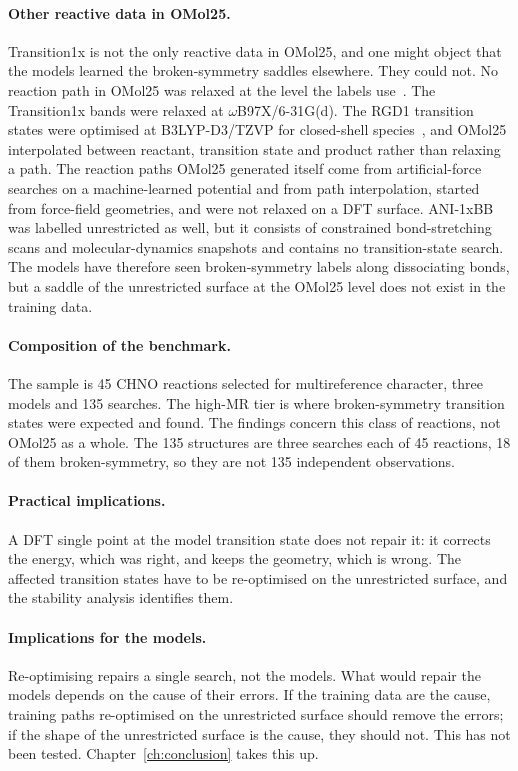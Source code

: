 \paragraph{Other reactive data in OMol25.} Transition1x is not the only
reactive data in OMol25, and one might object that the models learned
the broken-symmetry saddles elsewhere. They could not. No reaction
path in OMol25 was relaxed at the level the labels use~\cite{omol25}.
The Transition1x bands were relaxed at \mbox{$\omega$B97X/6-31G(d)}.
The RGD1 transition states were optimised at B3LYP-D3/TZVP for
closed-shell species~\cite{zhao2023rgd1}, and OMol25 interpolated
between reactant, transition state and product rather than relaxing a
path. The reaction paths OMol25 generated itself come from
artificial-force searches on a machine-learned potential and from path
interpolation, started from force-field geometries, and were not
relaxed on a DFT surface. ANI-1xBB~\cite{zhang2025ani1xbb} was labelled
unrestricted as well, but it consists of constrained bond-stretching
scans and molecular-dynamics snapshots and contains no transition-state
search. The models have therefore seen broken-symmetry labels along
dissociating bonds, but a saddle of the unrestricted surface at the
OMol25 level does not exist in the training data.

\paragraph{Composition of the benchmark.} The sample is 45 CHNO reactions
selected for multireference character, three models and 135 searches.
The high-MR tier is where broken-symmetry transition states were
expected and found. The findings concern this class of reactions, not
OMol25 as a whole. The 135 structures are three searches each of 45
reactions, 18 of them broken-symmetry, so they are not 135 independent
observations.

\paragraph{Practical implications.} A DFT single point at the model transition state
does not repair it: it corrects the energy, which was right, and keeps
the geometry, which is wrong. The affected transition states have to
be re-optimised on the unrestricted surface, and the stability
analysis identifies them.

\paragraph{Implications for the models.} Re-optimising repairs a single
search, not the models. What would repair the models depends on the
cause of their errors. If the training data
are the cause, training paths re-optimised on the unrestricted surface
should remove the errors; if the shape of the unrestricted surface is
the cause, they should not. This has not been tested.
Chapter~\ref{ch:conclusion} takes this up.
